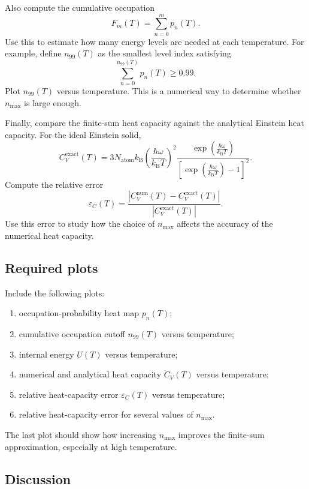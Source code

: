 Also compute the cumulative occupation
\[
F_m(T)=\sum_{n=0}^{m}p_n(T).
\]
Use this to estimate how many energy levels are needed at each temperature. For example, define \(n_{99}(T)\) as the smallest level index satisfying
\[
\sum_{n=0}^{n_{99}(T)}p_n(T)\ge0.99.
\]
Plot \(n_{99}(T)\) versus temperature. This is a numerical way to determine whether \(n_{\max}\) is large enough.

Finally, compare the finite-sum heat capacity against the analytical Einstein heat capacity. For the ideal Einstein solid,
\[
C_V^{\mathrm{exact}}(T)
=
3N_{\mathrm{atom}}k_{\mathrm B}
\left(
\frac{\hbar\omega}{k_{\mathrm B}T}
\right)^2
\frac{
\exp\left(\frac{\hbar\omega}{k_{\mathrm B}T}\right)
}{
\left[
\exp\left(\frac{\hbar\omega}{k_{\mathrm B}T}\right)-1
\right]^2
}.
\]
Compute the relative error
\[
\varepsilon_C(T)
=
\frac{
\left|C_V^{\mathrm{num}}(T)-C_V^{\mathrm{exact}}(T)\right|
}{
\left|C_V^{\mathrm{exact}}(T)\right|
}.
\]
Use this error to study how the choice of \(n_{\max}\) affects the accuracy of the numerical heat capacity.

\subsection{Required plots}

Include the following plots:

\begin{enumerate}
    \item occupation-probability heat map \(p_n(T)\);
    \item cumulative occupation cutoff \(n_{99}(T)\) versus temperature;
    \item internal energy \(U(T)\) versus temperature;
    \item numerical and analytical heat capacity \(C_V(T)\) versus temperature;
    \item relative heat-capacity error \(\varepsilon_C(T)\) versus temperature;
    \item relative heat-capacity error for several values of \(n_{\max}\).
\end{enumerate}

The last plot should show how increasing \(n_{\max}\) improves the finite-sum approximation, especially at high temperature.

\subsection{Discussion}

